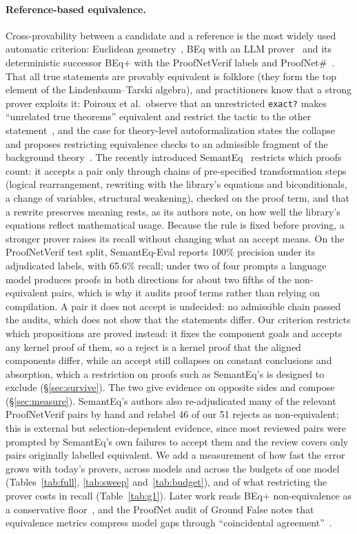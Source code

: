 \documentclass[10pt]{article}
\theoremstyle{definition}
\begin{document}
\paragraph{Reference-based equivalence.} Cross-provability between a candidate and a reference
is the most widely used automatic criterion: Euclidean geometry~\cite{eucgeo}, BEq with an LLM
prover~\cite{beqliu} and its deterministic successor BEq+ with the ProofNetVerif labels and
ProofNet\#~\cite{beq}. That all true statements are provably equivalent is folklore (they form
the top element of the Lindenbaum--Tarski algebra), and practitioners know that a strong prover
exploits it: Poiroux et al.\ observe that an unrestricted \texttt{exact?} makes ``unrelated true
theorems'' equivalent and restrict the tactic to the other statement~\cite{beq}, and the case for
theory-level autoformalization states the collapse and proposes restricting equivalence checks to
an admissible fragment of the background theory~\cite{tla}. The recently introduced
SemantEq~\cite{semanteq} restricts which proofs count: it accepts a pair only through chains of
pre-specified transformation steps (logical rearrangement, rewriting with the library's
equations and biconditionals, a change of variables, structural weakening), checked on the proof
term, and that a rewrite preserves meaning rests, as its authors note, on how well the library's
equations reflect mathematical usage. Because the rule is fixed before proving, a stronger prover
raises its recall without changing what an accept means. On the ProofNetVerif test split,
SemantEq-Eval reports 100\% precision under its adjudicated labels, with 65.6\% recall; under two
of four prompts a language model produces proofs in both directions for about two fifths of the
non-equivalent pairs, which is why it audits proof terms rather than relying on compilation. A
pair it does not accept is undecided: no admissible chain passed the audits, which does not show
that the statements differ. Our criterion restricts which propositions are proved instead: it
fixes the component goals and accepts any kernel proof of them, so a reject is a kernel proof
that the aligned components differ, while an accept still collapses on constant conclusions and
absorption, which a restriction on proofs such as SemantEq's is designed to exclude
(\S\ref{sec:survive}). The two give evidence on opposite sides and compose
(\S\ref{sec:measure}). SemantEq's authors also re-adjudicated many of the relevant
ProofNetVerif pairs by hand and relabel 46 of our 51 rejects as non-equivalent; this is external
but selection-dependent evidence, since most reviewed pairs were prompted by SemantEq's own
failures to accept them and the review covers only pairs originally labelled equivalent. We
add a measurement of how fast the error grows with today's provers, across models and across the
budgets of one model (Tables~\ref{tab:full}, \ref{tab:sweep} and~\ref{tab:budget}), and of what
restricting the prover costs in recall (Table~\ref{tab:g1}). Later work reads BEq+ non-equivalence as a
conservative floor~\cite{paraphrase}, and the ProofNet audit of Ground False notes that equivalence
metrics compress model gaps through ``coincidental agreement''~\cite{pnv}.
\end{document}
